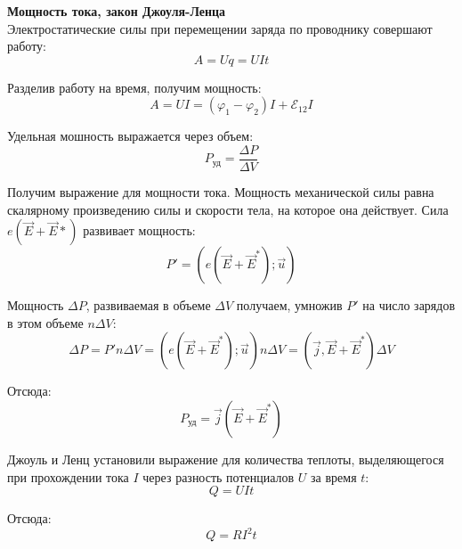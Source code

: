 \documentclass{article}
\begin{document}
	
	\textbf{Мощность тока, закон Джоуля-Ленца}\\

	Электростатические силы при перемещении заряда по проводнику совершают работу:
	\begin{equation}
		A = Uq = UIt
	\end{equation}

	Разделив работу на время, получим мощность:
	\begin{equation}
		A = UI = (\varphi_1-\varphi_2)I + \mathcal{E}_{12}I
	\end{equation}

	Удельная мошность выражается через объем:
	\begin{equation}
		P_{\text{уд}} = \frac{\Delta P}{\Delta V}
	\end{equation}

	Получим выражение для мощности тока. Мощность механической силы равна скалярному произведению силы и скорости тела, на которое она действует. Сила $e(\vec E + \vec E*)$ развивает мощность:
	\begin{equation}
		P' = (e(\vec E + \vec E^*);\vec u)
	\end{equation}

	Мощность $\Delta P$, развиваемая в объеме $\Delta V$ получаем, умножив $P'$ на число зарядов в этом объеме $n\Delta V$:
	\begin{equation}
		\Delta P = P'n\Delta V = (e(\vec E + \vec E^*);\vec u) n\Delta V = (\vec j,\vec E + \vec E^*)\Delta V
	\end{equation}

	Отсюда:
	\begin{equation}
		P_{\text{уд}} = \vec j(\vec E + \vec E^*)
	\end{equation}

	Джоуль и Ленц установили выражение для количества теплоты, выделяющегося при прохождении тока $I$ через разность потенциалов $U$ за время $t$:
	\begin{equation}
		Q = UIt
	\end{equation}

	Отсюда:
	\begin{equation}
		Q = RI^2 t
	\end{equation}
\end{document}
